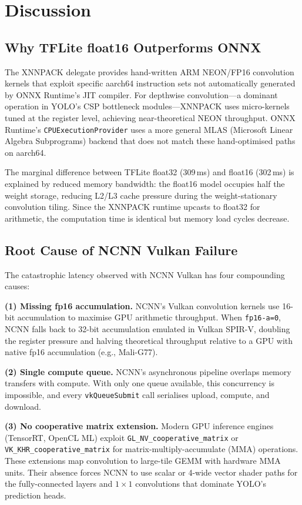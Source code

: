 \documentclass[conference]{IEEEtran}
\begin{document}
\section{Discussion}

\subsection{Why TFLite float16 Outperforms ONNX}

The XNNPACK delegate provides hand-written ARM NEON/FP16 convolution kernels
that exploit specific aarch64 instruction sets not automatically generated by
ONNX Runtime's JIT compiler. For depthwise convolution—a dominant operation
in YOLO's CSP bottleneck modules—XNNPACK uses micro-kernels tuned at the
register level, achieving near-theoretical NEON throughput. ONNX Runtime's
\texttt{CPUExecutionProvider} uses a more general MLAS (Microsoft Linear
Algebra Subprograms) backend that does not match these hand-optimised paths
on aarch64.

The marginal difference between TFLite float32 (309\,ms) and float16
(302\,ms) is explained by reduced memory bandwidth: the float16 model
occupies half the weight storage, reducing L2/L3 cache pressure during the
weight-stationary convolution tiling. Since the XNNPACK runtime upcasts
to float32 for arithmetic, the computation time is identical but memory
load cycles decrease.

\subsection{Root Cause of NCNN Vulkan Failure}

The catastrophic latency observed with NCNN Vulkan has four compounding causes:

\textbf{(1) Missing fp16 accumulation.}
NCNN's Vulkan convolution kernels use 16-bit accumulation to maximise
GPU arithmetic throughput. When \texttt{fp16-a=0}, NCNN falls back to
32-bit accumulation emulated in Vulkan SPIR-V, doubling the register
pressure and halving theoretical throughput relative to a GPU with native
fp16 accumulation (e.g., Mali-G77).

\textbf{(2) Single compute queue.}
NCNN's asynchronous pipeline overlaps memory transfers with compute.
With only one queue available, this concurrency is impossible, and every
\texttt{vkQueueSubmit} call serialises upload, compute, and download.

\textbf{(3) No cooperative matrix extension.}
Modern GPU inference engines (TensorRT, OpenCL ML) exploit
\texttt{GL\_NV\_cooperative\_matrix} or
\texttt{VK\_KHR\_cooperative\_matrix} for matrix-multiply-accumulate
(MMA) operations. These extensions map convolution to large-tile
GEMM with hardware MMA units. Their absence forces NCNN to use
scalar or 4-wide vector shader paths for the fully-connected layers
and $1\times1$ convolutions that dominate YOLO's prediction heads.
\end{document}
